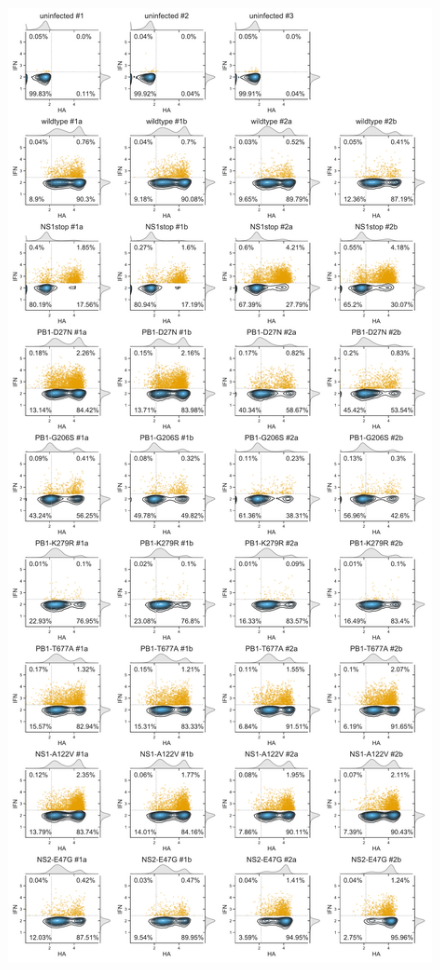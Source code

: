 \documentclass[9pt,lineno]{template}
\begin{document}
\begin{figure}
{\includegraphics[height=0.71\textheight]{figures/Validation_Figure/SNP_flow_plot.pdf}}
\label{figsupp:SNPflow}


\end{figure}
\end{document}

